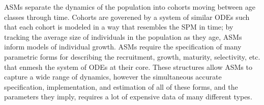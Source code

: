 
%

%
ASMs separate the dynamics of the population into cohorts moving between age 
classes through time. %
Cohorts are goverened by a system of similar ODEs such that 
each cohort is modeled in a way that resembles the SPM in time; by
tracking the average size of individuals in the population as they age, 
ASMs inform models of individual growth. ASMs require the 
specification of many parametric forms for describing the recruitment, 
growth, maturity, selectivity, etc. that enmesh the system of ODEs at their 
core. These structures allow ASMs to capture a wide range of dynamics, however 
the simultaneous accurate specification, implementation, and estimation of all of 
these forms, and the parameters they imply, requires a lot of expensive data 
of many different types. 
%



